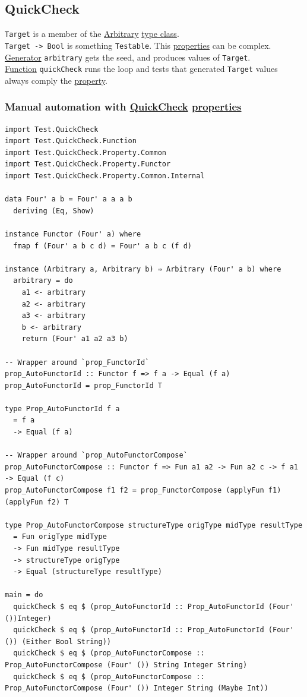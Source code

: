 \documentclass[a4paper,14pt,oneside]{book}
\begin{document}
\subsection{\label{org44d2c2e}QuickCheck}
\label{sec:org9c9b4d1}
\texttt{Target} is a member of the \hyperref[org7111dc3]{Arbitrary} \hyperref[org13bf178]{type class}.\\
\texttt{Target -> Bool} is something \texttt{Testable}. This \hyperref[org173b1e1]{properties} can be complex.\\
\hyperref[orga358193]{Generator} \texttt{arbitrary} gets the seed, and produces values of \texttt{Target}.\\
\hyperref[org13e0181]{Function} \texttt{quickCheck} runs the loop and tests that generated \texttt{Target} values always comply the \hyperref[org039a346]{property}.\\

\subsubsection{Manual automation with \hyperref[org44d2c2e]{QuickCheck} \hyperref[org173b1e1]{properties}}
\label{sec:org0c01e5a}

\begin{verbatim}
import Test.QuickCheck
import Test.QuickCheck.Function
import Test.QuickCheck.Property.Common
import Test.QuickCheck.Property.Functor
import Test.QuickCheck.Property.Common.Internal

data Four' a b = Four' a a a b
  deriving (Eq, Show)

instance Functor (Four' a) where
  fmap f (Four' a b c d) = Four' a b c (f d)

instance (Arbitrary a, Arbitrary b) ⇒ Arbitrary (Four' a b) where
  arbitrary = do
    a1 <- arbitrary
    a2 <- arbitrary
    a3 <- arbitrary
    b <- arbitrary
    return (Four' a1 a2 a3 b)

-- Wrapper around `prop_FunctorId`
prop_AutoFunctorId :: Functor f => f a -> Equal (f a)
prop_AutoFunctorId = prop_FunctorId T

type Prop_AutoFunctorId f a
  = f a
  -> Equal (f a)

-- Wrapper around `prop_AutoFunctorCompose`
prop_AutoFunctorCompose :: Functor f => Fun a1 a2 -> Fun a2 c -> f a1 -> Equal (f c)
prop_AutoFunctorCompose f1 f2 = prop_FunctorCompose (applyFun f1) (applyFun f2) T

type Prop_AutoFunctorCompose structureType origType midType resultType
  = Fun origType midType
  -> Fun midType resultType
  -> structureType origType
  -> Equal (structureType resultType)

main = do
  quickCheck $ eq $ (prop_AutoFunctorId :: Prop_AutoFunctorId (Four' ())Integer)
  quickCheck $ eq $ (prop_AutoFunctorId :: Prop_AutoFunctorId (Four' ()) (Either Bool String))
  quickCheck $ eq $ (prop_AutoFunctorCompose :: Prop_AutoFunctorCompose (Four' ()) String Integer String)
  quickCheck $ eq $ (prop_AutoFunctorCompose :: Prop_AutoFunctorCompose (Four' ()) Integer String (Maybe Int))
\end{verbatim}
\end{document}
